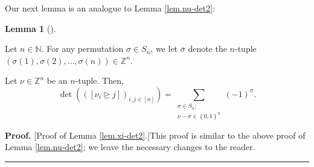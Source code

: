 \documentclass
[numbers=enddot,12pt,final,onecolumn,notitlepage,english]{scrartcl}%
\theoremstyle{definition}
\newtheorem{lem}[theo]{Lemma}
\newenvironment{lemma}[1][]
{\begin{lem}[#1]\begin{leftbar}}
{\end{leftbar}\end{lem}}
\newenvironment{proof}[1][Proof]{\noindent\textbf{#1.} }{\ \rule{0.5em}{0.5em}}
\let\sumnonlimits\sum
\renewcommand{\sum}{\sumnonlimits\limits}
\newenvironment{vershort}{}{}
\begin{document}
Our next lemma is an analogue to Lemma \ref{lem.nu-det2}:

\begin{lemma}
\label{lem.xi-det2}Let $n\in\mathbb{N}$. For any permutation $\sigma\in S_{n}%
$, we let $\overline{\sigma}$ denote the $n$-tuple $\left(  \sigma\left(
1\right)  ,\sigma\left(  2\right)  ,\ldots,\sigma\left(  n\right)  \right)
\in\mathbb{Z}^{n}$.

Let $\nu\in\mathbb{Z}^{n}$ be an $n$-tuple. Then,%
\[
\det\left(  \left(  \left[  \nu_{i}\trianglerighteq j\right]  \right)
_{i,j\in\left[  n\right]  }\right)  =\sum_{\substack{\sigma\in S_{n}%
;\\\nu-\overline{\sigma}\in\left\{  0,1\right\}  ^{n}}}\left(  -1\right)
^{\sigma}.
\]

\end{lemma}

\begin{vershort}
\begin{proof}
[Proof of Lemma \ref{lem.xi-det2}.]This proof is similar to the above proof of
Lemma \ref{lem.nu-det2}; we leave the necessary changes to the reader.
\end{proof}
\end{vershort}
\end{document}
